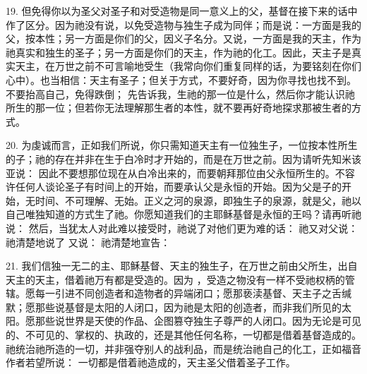 19. 但免得你以为圣父对圣子和对受造物是同一意义上的父，基督在接下来的话中作了区分。因为祂没有说，以免受造物与独生子成为同伴；而是说：一方面是我的父，按本性；另一方面是你们的父，因义子名分。又说，一方面是我的天主，作为祂真实和独生的圣子；另一方面是你们的天主，作为祂的化工。因此，天主子是真实天主，在万世之前不可言喻地受生（我常向你们重复同样的话，为要铭刻在你们心中）。也当相信：天主有圣子；但关于方式，不要好奇，因为你寻找也找不到。不要抬高自己，免得跌倒；  先告诉我，生祂的那一位是什么，然后你才能认识祂所生的那一位；但若你无法理解那生者的本性，就不要再好奇地探求那被生者的方式。\par

20. 为虔诚而言，正如我们所说，你只需知道天主有一位独生子，一位按本性所生的子；祂的存在并非在生于白冷时才开始的，而是在万世之前。因为请听先知米该亚说： 因此不要想那位现在从白冷出来的，而要朝拜那位由父永恒所生的。不容许任何人谈论圣子有时间上的开始，而要承认父是永恒的开始。因为父是子的开始，无时间、不可理解、无始。正义之河的泉源，即独生子的泉源，就是父，祂以自己唯独知道的方式生了祂。你愿知道我们的主耶稣基督是永恒的王吗？请再听祂说：  然后，当犹太人对此难以接受时，祂说了对他们更为难的话： 祂又对父说： 祂清楚地说了 又说：  祂清楚地宣告：\par

21. 我们信独一无二的主、耶稣基督、天主的独生子，在万世之前由父所生，出自天主的天主，借着祂万有都是受造的。因为 ，受造之物没有一样不受祂权柄的管辖。愿每一引进不同创造者和造物者的异端闭口；愿那亵渎基督、天主子之舌缄默；愿那些说基督是太阳的人闭口，因为祂是太阳的创造者，而非我们所见的太阳。愿那些说世界是天使的作品、企图篡夺独生子尊严的人闭口。因为无论是可见的、不可见的、掌权的、执政的，还是其他任何名称，一切都是借着基督造成的。祂统治祂所造的一切，并非强夺别人的战利品，而是统治祂自己的化工，正如福音作者若望所说：  一切都是借着祂造成的，天主圣父借着圣子工作。\par

